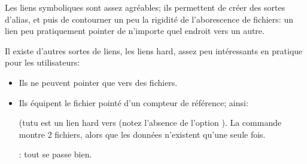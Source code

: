   Les liens symboliques sont assez agréables; ils permettent de créer des
  sortes d'alias, et puis de contourner un peu la rigidité de
  l'aborescence de fichiers: un lien peu pratiquement pointer de
  n'importe quel endroit vers un autre.
      
Il existe d'autres sortes de liens, les liens \og hard\fg, assez peu
intéressants en pratique pour les utilisateurs:\label{hardlink}
\begin{itemize}
\item Ils ne peuvent pointer que vers des fichiers.
\item Ils équipent le fichier pointé d'un compteur de référence;
  ainsi:

   (tutu est un lien \og hard\fg{} vers 
  (notez l'absence de l'option ). La commande  montre
    2 fichiers, alors que les données n'existent qu'une seule fois.


   : tout se passe bien.
\end{itemize}
  
  
